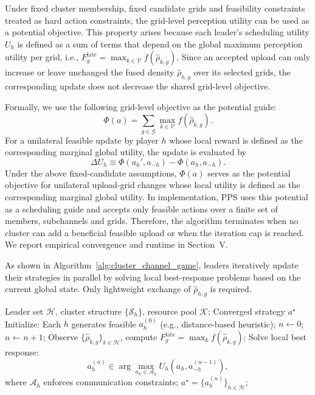 \documentclass[conference]{IEEEtran}
\begin{document}
Under fixed cluster membership, fixed candidate grids and feasibility constraints treated as hard action constraints, the grid-level perception utility can be used as a potential objective. This property arises because each leader's scheduling utility $U_h$ is defined as a sum of terms that depend on the global maximum perception utility per grid, i.e., $F_g^{\mathrm{late}} = \max_{k \in \mathcal{V}} f(\hat{\rho}_{k,g})$. Since an accepted upload can only increase or leave unchanged the fused density $\hat{\rho}_{h,g}$ over its selected grids, the corresponding update does not decrease the shared grid-level objective.

Formally, we use the following grid-level objective as the potential guide:
\begin{equation}
\Phi(a) = \sum_{g \in \mathcal{G}} \max_{k \in \mathcal{V}} f(\hat{\rho}_{k,g}).
\end{equation}
For a unilateral feasible update by player $h$ whose local reward is defined as the corresponding marginal global utility, the update is evaluated by
\begin{equation}
\Delta U_h \equiv \Phi(a_h', a_{-h}) - \Phi(a_h, a_{-h}).
\end{equation}
Under the above fixed-candidate assumptions, $\Phi(a)$ serves as the potential objective for unilateral upload-grid changes whose local utility is defined as the corresponding marginal global utility. In implementation, PPS uses this potential as a scheduling guide and accepts only feasible actions over a finite set of members, subchannels and grids. Therefore, the algorithm terminates when no cluster can add a beneficial feasible upload or when the iteration cap is reached. We report empirical convergence and runtime in Section~V.

As shown in Algorithm~\ref{alg:cluster_channel_game}, leaders iteratively update their strategies in parallel by solving local best-response problems based on the current global state. Only lightweight exchange of $\hat{\rho}_{h,g}$ is required.

\begin{algorithm}[ht]
\caption{Potential-Guided PPS Framework for Distributed Scheduling}
\label{alg:cluster_channel_game}
\begin{algorithmic}[1]
\REQUIRE Leader set $\mathcal{H}$, cluster structure $\{\mathcal{S}_h\}$, resource pool $\mathcal{K}$;
\ENSURE Converged strategy $a^\star$
\STATE Initialize: Each $h$ generates feasible $a_h^{(0)}$ (e.g., distance-based heuristic);
\STATE $n \gets 0$;
\REPEAT
    \STATE $n \gets n + 1$;
        \STATE Observe $\{\hat{\rho}_{k,g}\}_{k \in \mathcal{H}}$, compute $F_g^{\mathrm{late}} = \max_k f(\hat{\rho}_{k,g})$;
        \STATE Solve local best response:
        \[
        a_h^{(n)} \in \arg\max_{a_h \in \mathcal{A}_h} U_h(a_h, a_{-h}^{(n-1)}),
        \]
        where $\mathcal{A}_h$ enforces communication constraints;
    \ENDFOR
{}
\RETURN $a^\star = \{a_h^{(n)}\}_{h \in \mathcal{H}}$;
\end{algorithmic}
\end{algorithm}
\end{document}
